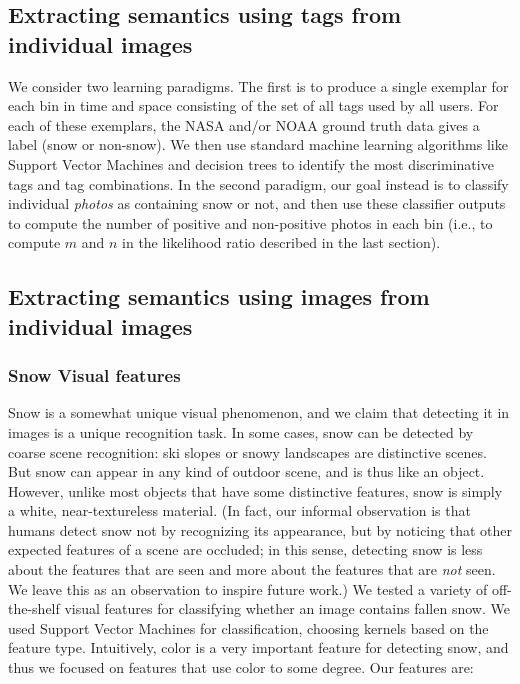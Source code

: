 \documentclass[10pt,journal,compsoc]{IEEEtran}
\begin{document}
\subsection{Extracting semantics using tags from individual images}

We consider two learning paradigms. The first
is to produce a single exemplar for each bin in time and space
consisting of the set of all tags used by all users. For each of these
exemplars, the NASA and/or NOAA ground truth data gives a label (snow
or non-snow). We then use standard machine learning algorithms like
Support Vector Machines and decision trees to identify the most
discriminative tags and tag combinations. In the second paradigm, our
goal instead is to classify individual \textit{photos} as containing
snow or not, and then use these classifier outputs to compute the
number of positive and non-positive photos in each bin (i.e., to
compute $m$ and $n$ in the likelihood ratio described in the last
section).

\subsection{Extracting semantics using images from individual images}



\subsubsection{Snow Visual features}
Snow is a somewhat unique visual phenomenon, and we claim that
detecting it in images is a unique recognition task. In some cases,
snow can be detected by coarse scene recognition: ski slopes or snowy
landscapes are distinctive scenes. But snow can appear in any kind of
outdoor scene, and is thus like an object. However, unlike most
objects that have some distinctive features, snow is simply a white,
near-textureless material.  (In fact, our informal observation is that
humans detect snow not by recognizing its appearance, but by noticing
that other expected features of a scene are occluded; in this sense,
detecting snow is less about the features that are seen and more about
the features that are \textit{not} seen. We leave this as an
observation to inspire future work.)
%
We tested a variety of off-the-shelf visual features for classifying
whether an image contains fallen snow. We used Support Vector
Machines for classification, choosing kernels based on the feature
type.  Intuitively, color is a very important feature for detecting
snow, and thus we focused on features that use color to some
degree. Our features are:
\end{document}
